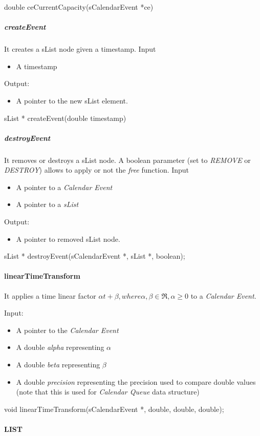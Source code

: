 double ceCurrentCapacity(sCalendarEvent *ce)


\subparagraph{createEvent}

It creates a sList node given a timestamp.
Input
\begin{itemize}
\item A timestamp
\end{itemize}
Output:
\begin{itemize}
\item A pointer to the new sList element.
\end{itemize}
sList * createEvent(double timestamp)

\subparagraph{destroyEvent}

It removes or destroys a sList node. A boolean parameter (set to \textit{REMOVE} or \textit{DESTROY}) allows to apply or not the \textit{free} function.
Input
\begin{itemize}
\item A pointer to a \textit{Calendar Event}
\item A pointer to a \textit{sList}
\end{itemize}
Output:
\begin{itemize}
\item A pointer to removed sList node.
\end{itemize}
sList * 	destroyEvent(sCalendarEvent *, sList *, boolean);

\paragraph{linearTimeTransform}

It applies a time linear factor \(\alpha t + \beta , where \alpha, \beta \in \Re, \alpha \geq 0\) to a \textit{Calendar Event}. 
 
Input:
\begin{itemize}
\item A pointer to the \textit{Calendar Event} 
\item A double \textit{alpha} representing \(\alpha\)
\item A double \textit{beta} representing \(\beta\)
\item A double \textit{precision} representing the precision used to compare double values (note that this is used for \textit{Calendar Queue} data structure)
\end{itemize}
void linearTimeTransform(sCalendarEvent *, double, double, double);


\paragraph{LIST}

